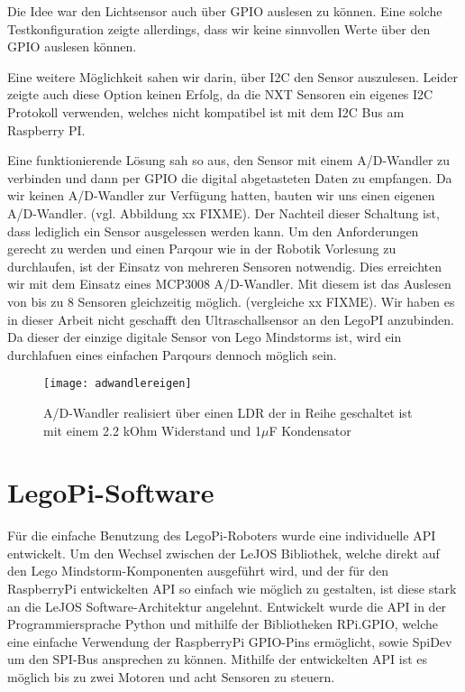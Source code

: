Die Idee war den Lichtsensor auch über GPIO auslesen zu können. Eine solche Testkonfiguration zeigte allerdings, dass wir keine sinnvollen Werte über den GPIO auslesen können. 

Eine weitere Möglichkeit sahen wir darin, über I2C den Sensor auszulesen. Leider zeigte auch diese Option keinen Erfolg, da die NXT Sensoren ein eigenes I2C  Protokoll verwenden, welches nicht kompatibel ist mit dem I2C Bus am Raspberry PI. 

Eine funktionierende Lösung sah so aus, den Sensor mit einem A/D-Wandler zu verbinden und dann per GPIO die digital abgetasteten Daten zu empfangen. Da wir keinen A/D-Wandler zur Verfügung hatten, bauten wir uns einen eigenen A/D-Wandler. (vgl. Abbildung xx FIXME). Der Nachteil dieser Schaltung ist, dass lediglich ein Sensor ausgelessen werden kann. Um den Anforderungen gerecht zu werden und einen Parqour wie in der Robotik Vorlesung zu durchlaufen, ist der Einsatz von mehreren Sensoren notwendig. Dies erreichten wir mit dem Einsatz eines MCP3008 A/D-Wandler. Mit diesem ist das Auslesen von bis zu 8 Sensoren gleichzeitig möglich. (vergleiche xx FIXME). Wir haben es in dieser Arbeit nicht geschafft den Ultraschallsensor an den LegoPI anzubinden. Da dieser der einzige digitale Sensor von Lego Mindstorms ist, wird ein durchlafuen eines einfachen Parqours dennoch möglich sein.

\begin{figure}[h]
  \centering
  \texttt{[image: adwandlereigen]}
  \caption{A/D-Wandler realisiert über einen LDR der in Reihe geschaltet ist mit einem 2.2 kOhm Widerstand und 1$\mu$F Kondensator}
  \label{Kap1:Lightsensor}
\end{figure}

\chapter{LegoPi-Software}
\label{Kap3}

Für die einfache Benutzung des LegoPi-Roboters wurde eine individuelle API entwickelt. Um den Wechsel zwischen der LeJOS Bibliothek, welche direkt auf den Lego Mindstorm-Komponenten ausgeführt wird, und der für den RaspberryPi entwickelten API so einfach wie möglich zu gestalten, ist diese stark an die LeJOS Software-Architektur angelehnt. Entwickelt wurde die API in der Programmiersprache Python und mithilfe der Bibliotheken RPi.GPIO, welche eine einfache Verwendung der RaspberryPi GPIO-Pins ermöglicht, sowie SpiDev um den SPI-Bus ansprechen zu können. Mithilfe der entwickelten API ist es möglich bis zu zwei Motoren und acht Sensoren zu steuern.

